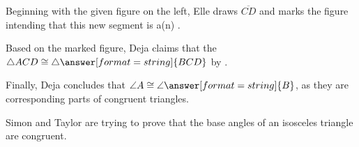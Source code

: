 \documentclass[nooutcomes]{ximera}
\begin{document}
\begin{problem}
Beginning with the given figure on the left, Elle draws $\overline{CD}$ and marks the figure intending that this new segment is a(n) .

Based on the marked figure, Deja claims that the $\triangle ACD\cong \triangle\answer[format=string]{BCD}$ by . 

Finally, Deja concludes that $\angle A\cong \angle\answer[format=string]{B}$, as they are corresponding parts of congruent triangles. 
 

\end{problem}


\begin{problem}
Simon and Taylor are trying to prove that the base angles of an isosceles triangle are congruent.   


\end{problem}
\end{document}
